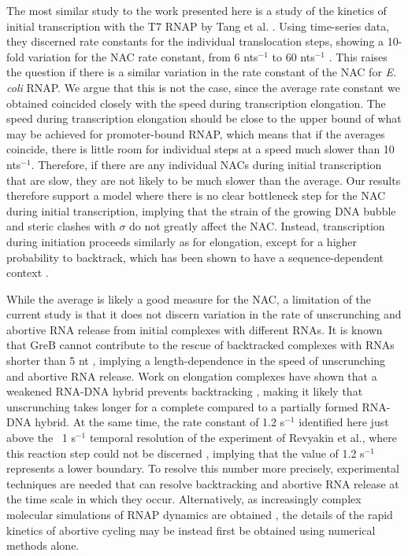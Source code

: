 The most similar study to the work presented here is a study of the kinetics
of initial transcription with the T7 RNAP by Tang et al.
\cite{tang_real-time_2009}. Using time-series data, they discerned rate
constants for the individual translocation steps, showing a 10-fold variation
for the NAC rate constant, from 6 nts$^{-1}$ to 60 nts$^{-1}$
\cite{tang_real-time_2009}. This raises the question if there is a similar
variation in the rate constant of the NAC for \textit{E. coli} RNAP. We 
argue that this is not the case, since the average rate constant we obtained
coincided closely with the speed during transcription elongation. The speed
during transcription elongation should be close to the upper bound of what may
be achieved for promoter-bound RNAP, which means that if the averages
coincide, there is little room for individual steps at a speed much slower than
10 nts$^{-1}$. Therefore, if there are any individual NACs during
initial transcription that are slow, they are not likely to be much slower
than the average. Our results therefore support a model where there is no
clear bottleneck step for the NAC during initial transcription, implying that
the strain of the growing DNA bubble and steric clashes with $\sigma$ do
not greatly affect the NAC. Instead, transcription during initiation proceeds
similarly as for elongation, except for a higher probability to backtrack,
which has been shown to have a sequence-dependent context
\cite{skancke_sequence-dependent_2015}.


While the average is likely a good measure for the NAC, a limitation of the
current study is that it does not discern variation in the rate of unscrunching
and abortive RNA release from initial complexes with different RNAs. It is
known that GreB cannot contribute to the rescue of backtracked complexes with
RNAs shorter than 5 nt \cite{hsu_initial_2006}, implying a length-dependence
in the speed of unscrunching and abortive RNA release. Work on elongation
complexes have shown that a weakened RNA-DNA hybrid prevents backtracking
\cite{nudler_rnadna_1997}, making it likely that unscrunching takes longer for
a complete compared to a partially formed RNA-DNA hybrid. At the same time,
the rate constant of 1.2 s$^{-1}$ identified here just above the ~1 s$^{-1}$
temporal resolution of the experiment of Revyakin et al., where this reaction
step could not be discerned \cite{revyakin_abortive_2006}, implying that the
value of 1.2 s$^{-1}$ represents a lower boundary. To resolve this number more
precisely, experimental techniques are needed that can resolve backtracking
and abortive RNA release at the time scale in which they occur. Alternatively,
as increasingly complex molecular simulations of RNAP dynamics are obtained
\cite{silva_millisecond_2014}, the details of the rapid kinetics of abortive
cycling may be instead first be obtained using numerical methods alone.

